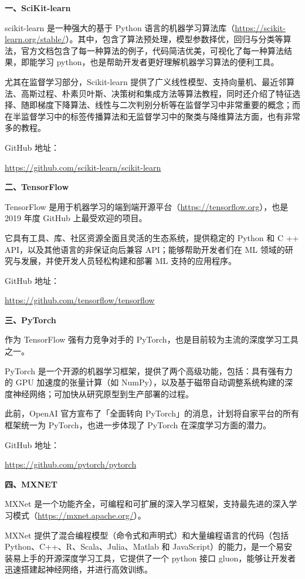 \documentclass[]{ctexbook}
\begin{document}
\textbf{一、SciKit-learn}

scikit-learn 是一种强大的基于 Python 语言的机器学习算法库（\url{https://scikit-learn.org/stable/}）。其中，包含了算法预处理，模型参数择优，回归与分类等算法，官方文档包含了每一种算法的例子，代码简洁优美，可视化了每一种算法结果，即能学习 python，也是帮助开发者更好理解机器学习算法的便利工具。

尤其在监督学习部分，Scikit-learn 提供了广义线性模型、支持向量机、最近邻算法、高斯过程、朴素贝叶斯、决策树和集成方法等算法教程，同时还介绍了特征选择、随即梯度下降算法、线性与二次判别分析等在监督学习中非常重要的概念；而在半监督学习中的标签传播算法和无监督学习中的聚类与降维算法方面，也有非常多的教程。

GitHub 地址：

\url{https://github.com/scikit-learn/scikit-learn}

\textbf{二、TensorFlow}

TensorFlow 是用于机器学习的端到端开源平台（\url{https://tensorflow.org}），也是 2019 年度 GitHub 上最受欢迎的项目。

它具有工具、库、社区资源全面且灵活的生态系统，提供稳定的 Python 和 C ++ API，以及其他语言的非保证向后兼容 API；能够帮助开发者们在 ML 领域的研究与发展，并使开发人员轻松构建和部署 ML 支持的应用程序。

GitHub 地址：

\url{https://github.com/tensorflow/tensorflow}

\textbf{三、PyTorch}

作为 TensorFlow 强有力竞争对手的 PyTorch，也是目前较为主流的深度学习工具之一。

PyTorch 是一个开源的机器学习框架，提供了两个高级功能，包括：具有强有力的 GPU 加速度的张量计算（如 NumPy），以及基于磁带自动调整系统构建的深度神经网络；可加快从研究原型到生产部署的过程。

此前，OpenAI 官方宣布了「全面转向 PyTorch」的消息，计划将自家平台的所有框架统一为 PyTorch，也进一步体现了 PyTorch 在深度学习方面的潜力。

GitHub 地址：

\url{https://github.com/pytorch/pytorch}

\textbf{四、MXNET}

MXNet 是一个功能齐全，可编程和可扩展的深入学习框架，支持最先进的深入学习模式（\url{https://mxnet.apache.org/}）。

MXNet 提供了混合编程模型（命令式和声明式）和大量编程语言的代码（包括 Python、C++、R、Scala、Julia、Matlab 和 JavaScript）的能力，是一个易安装易上手的开源深度学习工具，它提供了一个 python 接口 gluon，能够让开发者迅速搭建起神经网络，并进行高效训练。
\end{document}

